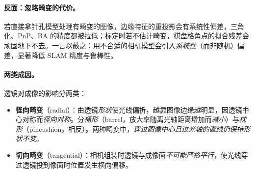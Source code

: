 \paragraph{反面：忽略畸变的代价。}
若直接拿针孔模型处理有畸变的图像，边缘特征的重投影会有系统性偏差，三角化、PnP、BA 的精度都被拉低；标定时若不估计畸变，棋盘格角点的拟合残差会顽固地下不去。一言以蔽之：用不合适的相机模型会引入\emph{系统性}（而非随机）偏差，显著降低 SLAM 精度与鲁棒性\cite{carlone2026handbook}。

\paragraph{两类成因。}
透镜对成像的影响分两类\cite{gaoxiang2019slam14}：
\begin{itemize}
  \item \textbf{径向畸变}（radial）：由透镜\emph{形状}使光线偏折，越靠图像边缘越明显，因透镜中心对称而\emph{径向对称}。分\emph{桶形}（barrel，放大率随离光轴距离增加而\emph{减小}）与\emph{枕形}（pincushion，相反）。两种畸变中，\emph{穿过图像中心且过光轴的直线仍保持形状不变}。
  \item \textbf{切向畸变}（tangential）：相机组装时透镜与成像面\emph{不可能严格平行}，使光线穿过透镜投到像面时位置发生横向偏移。
\end{itemize}

